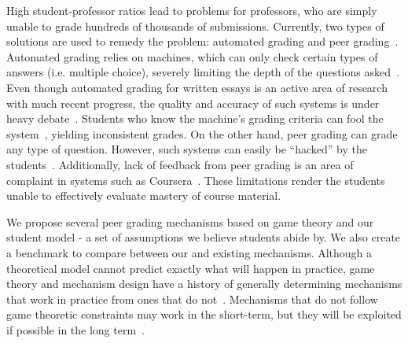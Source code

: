 \documentclass{chi-ext}
\begin{document}
High student-professor ratios lead to problems for professors, who are simply unable to grade hundreds of thousands of submissions. Currently, two types of solutions are used to remedy the problem: automated grading and peer grading~\cite{edxsoftware}. Automated grading relies on machines, which can only check certain types of answers (i.e. multiple choice), severely limiting the depth of the questions asked~\cite{rightandwrongMOOCs}. Even though automated grading for written essays is an active area of research with much recent progress, the quality and accuracy of such systems is under heavy debate~\cite{automatedsystemssuck}. Students who know the machine's grading criteria can fool the system~\cite{robogradingproblems}, yielding inconsistent grades. On the other hand, peer grading can grade any type of question. However, such systems can easily be ``hacked'' by the students~\cite{makingsenseofMOOCs}. Additionally, lack of feedback from peer grading is an area of complaint in systems such as Coursera~\cite{howaccurateispeergrading}. These limitations render the students unable to effectively evaluate mastery of course material. 

We propose several peer grading mechanisms based on game theory and our student model - a set of assumptions we believe students abide by. We also create a benchmark to compare between our and existing mechanisms. Although a theoretical model cannot predict exactly what will happen in practice, game theory and mechanism design have a history of generally determining mechanisms that work in practice from ones that do not~\cite{AGTbook}. Mechanisms that do not follow game theoretic constraints may work in the short-term, but they will be exploited if possible in the long term~\cite{boycottfinal}.
\end{document}
